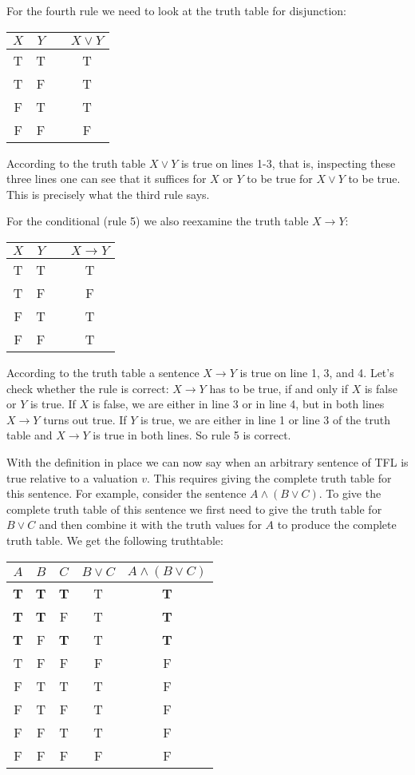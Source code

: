 For the fourth rule we need to look at the truth table for disjunction:
\begin{center}
\begin{tabular}{ccc|c}
$X$&$Y$&&$X\vee Y$\\\hline
T & T && T\\
T & F && T\\
F & T && T\\
F & F && F
\end{tabular}
\end{center}
According to the truth table $X\vee Y$ is true on lines 1-3, that is, inspecting these three lines one can see that it suffices for $X$ or $Y$ to be true for $X\vee Y$ to be true. This is precisely what the third rule says.

For the conditional (rule 5) we also reexamine the truth table $X\rightarrow Y$:
\begin{center}
\begin{tabular}{ccc|c}
$X$&$Y$&&$X\rightarrow Y$\\\hline
T & T && T\\
T & F && F\\
F & T && T\\
F & F && T
\end{tabular}
\end{center}
According to the truth table a sentence $X\rightarrow Y$ is true on line 1, 3, and 4. Let's check whether the rule is correct: $X\rightarrow Y$ has to be true, if and only if $X$ is false or $Y$ is true. If $X$ is false, we are either in line 3 or in line 4, but in both lines $X\rightarrow Y$ turns out true. If $Y$ is true, we are either in line 1 or line 3 of the truth table and $X\rightarrow Y$ is true in both lines. So rule 5 is correct.

With the definition in place we can now say when an arbitrary sentence of TFL is true relative to a valuation $v$. This requires giving the complete truth table for this sentence. For example, consider the sentence $A\wedge(B\vee C)$. To give the complete truth table of this sentence we first need to give the truth table for $B\vee C$ and then combine it with the truth values for $A$ to produce the complete truth table. We get the following truthtable:

\begin{center}
\begin{tabular}{ccc|c||c}
$A$&$B$&$C$&$B\vee C$&$A\wedge(B\vee C)$\\\hline
\textbf{T} & \textbf{T} &\textbf{T}& T & \textbf{T}\\
\textbf{T} & \textbf{T} & F& T & \textbf{T}\\
\textbf{T} & F & \textbf{T}& T& \textbf{T}\\
T & F &F&F& F\\
F & T &T&T&F\\
F& T & F & T &F\\
F & F & T &T &F\\
F & F & F& F& F
\end{tabular}
\end{center}

